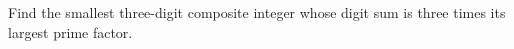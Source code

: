Find the smallest three-digit composite integer whose digit sum is three times its largest prime factor.
